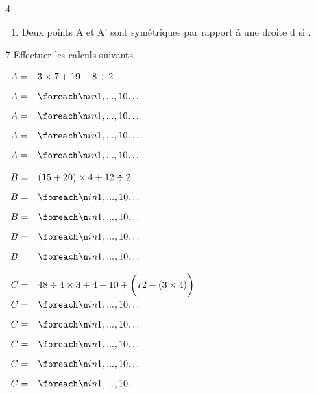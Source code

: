 \documentclass[a4paper]{book}
\begin{document}
{\begin{exerciceNote}{4}
\begin{enumerate}[leftmargin=*]
\begin{itemize}
                \medskip
                \item pour terminer, on effectue \points[15] de \points[10];
            \end{itemize}

            \medskip

            \item Deux points A et A' sont symétriques par rapport à une droite d si \points[18].
        \end{enumerate}
    \end{exerciceNote}


    \begin{exerciceNote}{7}
        Effectuer les calculs suivants.
   
        \begin{minipage}{0.3\linewidth}
            $\begin{array}{ll}
                A = & 3\times7+19-8\div2 \\[2ex]
                A = & \points[10]\\[2ex]
                A = & \points[10]\\[2ex]
                A = & \points[10]\\[2ex]
                A = & \points[10]
            \end{array}$

            \bigskip

            $\begin{array}{ll}
                B = & (15+20)\times 4 + 12\div2 \\[2ex]
                B = & \points[10]\\[2ex]
                B = & \points[10]\\[2ex]
                B = & \points[10]\\[2ex]
                B = & \points[10]
            \end{array}$  
        \end{minipage}
        \vline
        \begin{minipage}{0.35\linewidth}
            $\begin{array}{ll}
                C = & 48\div4\times3+4-10+\bigg(72-(3\times4)\bigg) \\[2ex]
                C = & \points[10]\\[2ex]
                C = & \points[10]\\[2ex]
                C = & \points[10]\\[2ex]
                C = & \points[10]\\[2ex]
                C = & \points[10]
            \end{array}$


\end{minipage}
\end{exerciceNote}}
\end{document}
